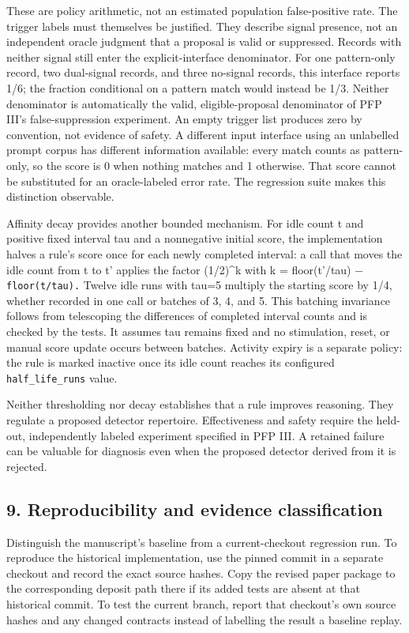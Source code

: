 \documentclass[
  11pt,
]{article}
\begin{document}
These are policy arithmetic, not an estimated population false-positive
rate. The trigger labels must themselves be justified. They describe
signal presence, not an independent oracle judgment that a proposal is
valid or suppressed. Records with neither signal still enter the
explicit-interface denominator. For one pattern-only record, two
dual-signal records, and three no-signal records, this interface reports
1/6; the fraction conditional on a pattern match would instead be 1/3.
Neither denominator is automatically the valid, eligible-proposal
denominator of PFP III's false-suppression experiment. An empty trigger
list produces zero by convention, not evidence of safety. A different
input interface using an unlabelled prompt corpus has different
information available: every match counts as pattern-only, so the score
is 0 when nothing matches and 1 otherwise. That score cannot be
substituted for an oracle-labeled error rate. The regression suite makes
this distinction observable.

Affinity decay provides another bounded mechanism. For idle count t and
positive fixed interval tau and a nonnegative initial score, the
implementation halves a rule's score once for each newly completed
interval: a call that moves the idle count from t to t' applies the
factor (1/2)\^{}k with k = floor(t'/tau) − \nolinkurl{floor(t/tau).}
Twelve idle runs with tau=5 multiply the starting score by 1/4, whether
recorded in one call or batches of 3, 4, and 5. This batching invariance
follows from telescoping the differences of completed interval counts
and is checked by the tests. It assumes tau remains fixed and no
stimulation, reset, or manual score update occurs between batches.
Activity expiry is a separate policy: the rule is marked inactive once
its idle count reaches its configured \nolinkurl{half_life_runs} value.

Neither thresholding nor decay establishes that a rule improves
reasoning. They regulate a proposed detector repertoire. Effectiveness
and safety require the held-out, independently labeled experiment
specified in PFP III. A retained failure can be valuable for diagnosis
even when the proposed detector derived from it is rejected.

\subsection{9. Reproducibility and evidence
classification}\label{reproducibility-and-evidence-classification}

Distinguish the manuscript's baseline from a current-checkout regression
run. To reproduce the historical implementation, use the pinned commit
in a separate checkout and record the exact source hashes. Copy the
revised paper package to the corresponding deposit path there if its
added tests are absent at that historical commit. To test the current
branch, report that checkout's own source hashes and any changed
contracts instead of labelling the result a baseline replay.
\end{document}
